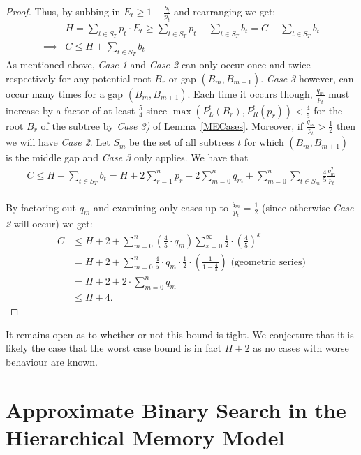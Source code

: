 \documentclass[letterpaper,12pt,titlepage,oneside,final]{book}
\theoremstyle{plain}
\begin{document}
\begin{proof}
\noindent Thus, by subbing in $E_t \geq 1 - \frac{b_t}{p_t}$ and rearranging we get: 
\begin{align*}
&H = \sum_{t \in S_T} p_t \cdot E_t \geq \sum_{t \in S_T} p_t - \sum_{t \in S_T} b_t = C - \sum_{t \in S_T} b_t \\
 \implies &C \leq H + \sum_{t \in S_T} b_t
\end{align*}
As mentioned above, \textit{Case 1} and \textit{Case 2} can only occur once and twice respectively for any potential root $B_r$ or gap $(B_m, B_{m+1})$. \textit{Case 3} however, can occur many times for a gap $(B_m, B_{m+1})$. Each time it occurs though, $\frac{q_m}{p_t}$ must increase by a factor of at least $\frac{5}{4}$ since $\max(P^t_L(B_r), P^t_R(p_r)) < \frac{4}{5}$ for the root $B_r$ of the subtree by \textit{Case 3)} of Lemma~\ref{MECases}. Moreover, if $\frac{q_m}{p_t} > \frac{1}{2}$ then we will have \textit{Case 2}. Let $S_m$ be the set of all subtrees $t$ for which $(B_m, B_{m+1})$ is the middle gap and \textit{Case 3} only applies. We have that
\begin{align*}
C \leq H + \sum_{t \in S_T} b_t = H + 2 \sum\limits_{r = 1}^n p_r + 2 \sum\limits_{m = 0}^n q_m + \sum\limits_{m = 0}^n \sum\limits_{t \in S_m} \frac{4}{5}\frac{q_m^2}{p_t}
\end{align*}
 \\ 
By factoring out $q_m$ and examining only cases up to $\frac{q_m}{p_t} = \frac{1}{2}$ (since otherwise \textit{Case 2} will occur) we get:
\begin{align*}
C &\leq H + 2 + \sum\limits_{m = 0}^n (\frac{4}{5} \cdot q_m) \sum\limits_{x=0}^{\infty} \frac{1}{2} \cdot (\frac{4}{5}) ^ x \\
 &= H + 2 + \sum\limits_{m = 0}^n \frac{4}{5} \cdot q_m \cdot \frac{1}{2} \cdot (\frac{1}{1-\frac{4}{5}}) \text{    (geometric series)} \\
 &=H + 2 + 2\cdot \sum\limits_{m = 0}^n q_m \\
 &\leq H + 4.
\end{align*}

\end{proof}

It remains open as to whether or not this bound is tight. We conjecture that it is likely the case that the worst case bound is in fact $H+2$ as no cases with worse behaviour are known.

\chapter{Approximate Binary Search in the Hierarchical Memory Model}\label{Approximate Binary Search in the Hierarchical Memory Model}
 
\end{document}
